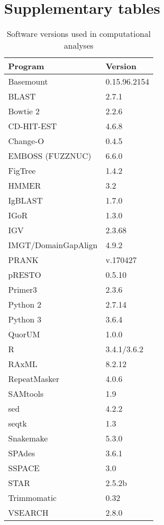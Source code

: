 \chapter{Supplementary tables}
\label{app:tables}

\begin{table}
\caption{Software versions used in computational analyses}
\label{tab:software-versions}
\centering
\begin{tabular}{ll}
  \toprule Program & Version \\ 
  \midrule Basemount & 0.15.96.2154 \\ 
  BLAST & 2.7.1 \\ 
  Bowtie 2 & 2.2.6 \\ 
  CD-HIT-EST & 4.6.8 \\ 
  Change-O & 0.4.5 \\ 
  EMBOSS (FUZZNUC) & 6.6.0 \\ 
  FigTree & 1.4.2 \\ 
  HMMER & 3.2 \\ 
  IgBLAST & 1.7.0 \\ 
  IGoR & 1.3.0 \\ 
  IGV & 2.3.68 \\ 
  IMGT/DomainGapAlign & 4.9.2 \\ 
  PRANK & v.170427 \\ 
  pRESTO & 0.5.10 \\ 
  Primer3 & 2.3.6 \\ 
  Python 2 & 2.7.14 \\ 
  Python 3 & 3.6.4 \\ 
  QuorUM & 1.0.0 \\ 
  R & 3.4.1/3.6.2 \\ 
  RAxML & 8.2.12 \\ 
  RepeatMasker & 4.0.6 \\ 
  SAMtools & 1.9 \\ 
  sed & 4.2.2 \\ 
  seqtk & 1.3 \\ 
  Snakemake & 5.3.0 \\ 
  SPAdes & 3.6.1 \\ 
  SSPACE & 3.0 \\ 
  STAR & 2.5.2b \\ 
  Trimmomatic & 0.32 \\ 
  VSEARCH & 2.8.0 \\ 
   \bottomrule 
\end{tabular}
\end{table}

